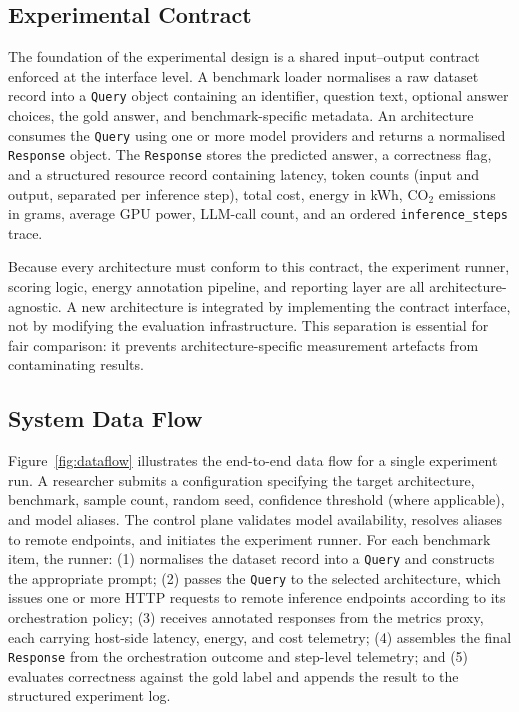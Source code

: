 \subsection{Experimental Contract}
\label{sec:contract}

The foundation of the experimental design is a shared input--output contract enforced at the interface level. A benchmark loader normalises a raw dataset record into a \texttt{Query} object containing an identifier, question text, optional answer choices, the gold answer, and benchmark-specific metadata. An architecture consumes the \texttt{Query} using one or more model providers and returns a normalised \texttt{Response} object. The \texttt{Response} stores the predicted answer, a correctness flag, and a structured resource record containing latency, token counts (input and output, separated per inference step), total cost, energy in kWh, CO$_2$ emissions in grams, average GPU power, LLM-call count, and an ordered \texttt{inference\_steps} trace.

Because every architecture must conform to this contract, the experiment runner, scoring logic, energy annotation pipeline, and reporting layer are all architecture-agnostic. A new architecture is integrated by implementing the contract interface, not by modifying the evaluation infrastructure. This separation is essential for fair comparison: it prevents architecture-specific measurement artefacts from contaminating results.

\subsection{System Data Flow}

Figure~\ref{fig:dataflow} illustrates the end-to-end data flow for a single experiment run. A researcher submits a configuration specifying the target architecture, benchmark, sample count, random seed, confidence threshold (where applicable), and model aliases. The control plane validates model availability, resolves aliases to remote endpoints, and initiates the experiment runner. For each benchmark item, the runner: (1) normalises the dataset record into a \texttt{Query} and constructs the appropriate prompt; (2) passes the \texttt{Query} to the selected architecture, which issues one or more HTTP requests to remote inference endpoints according to its orchestration policy; (3) receives annotated responses from the metrics proxy, each carrying host-side latency, energy, and cost telemetry; (4) assembles the final \texttt{Response} from the orchestration outcome and step-level telemetry; and (5) evaluates correctness against the gold label and appends the result to the structured experiment log.

